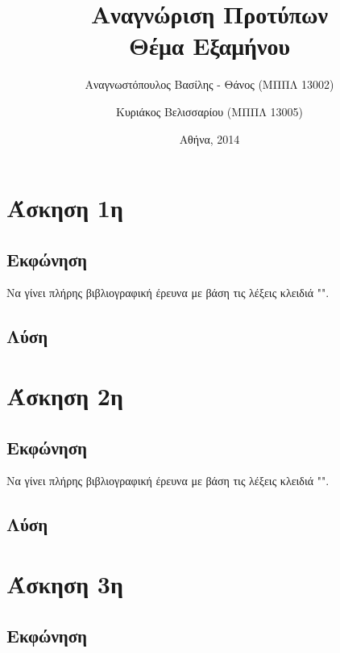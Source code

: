 \documentclass{assignment}
\title{Αναγνώριση Προτύπων \\ Θέμα Εξαμήνου }
\date{Αθήνα, 2014}
\author{Αναγνωστόπουλος Βασίλης - Θάνος (ΜΠΠΛ 13002) \and Κυριάκος Βελισσαρίου (ΜΠΠΛ 13005)}
\begin{document}
\maketitle

\setcounter{page}{1} 

\pagestyle{plain}
\tableofcontents
\listoffigures
\newpage

\setcounter{page}{1} 

\section{Άσκηση 1η}
\subsection{Εκφώνηση}

Να γίνει πλήρης βιβλιογραφική έρευνα με βάση τις λέξεις κλειδιά "".

\subsection {Λύση}

\section{Άσκηση 2η}
\subsection{Εκφώνηση}

Να γίνει πλήρης βιβλιογραφική έρευνα με βάση τις λέξεις κλειδιά "".

\subsection {Λύση}

\section{Άσκηση 3η}
\subsection{Εκφώνηση}
\end{document}
